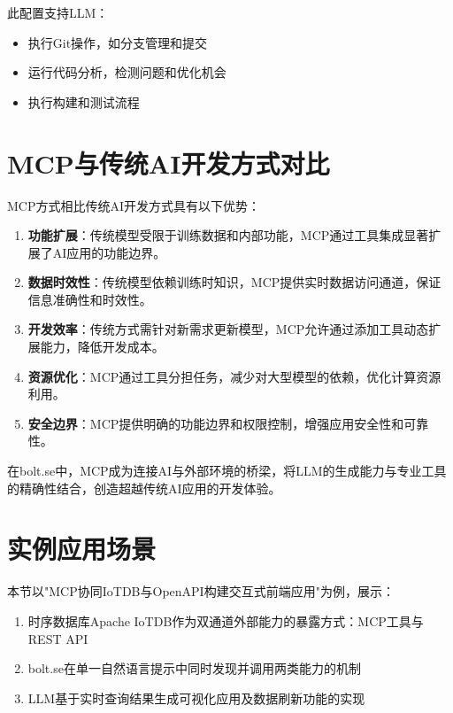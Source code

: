此配置支持LLM：
\begin{itemize}
  \item 执行Git操作，如分支管理和提交
  \item 运行代码分析，检测问题和优化机会
  \item 执行构建和测试流程
\end{itemize}

\section{MCP与传统AI开发方式对比}

MCP方式相比传统AI开发方式具有以下优势：

\begin{enumerate}
  \item \textbf{功能扩展}：传统模型受限于训练数据和内部功能，MCP通过工具集成显著扩展了AI应用的功能边界。

  \item \textbf{数据时效性}：传统模型依赖训练时知识，MCP提供实时数据访问通道，保证信息准确性和时效性。

  \item \textbf{开发效率}：传统方式需针对新需求更新模型，MCP允许通过添加工具动态扩展能力，降低开发成本。

  \item \textbf{资源优化}：MCP通过工具分担任务，减少对大型模型的依赖，优化计算资源利用。

  \item \textbf{安全边界}：MCP提供明确的功能边界和权限控制，增强应用安全性和可靠性。
\end{enumerate}

在bolt.se中，MCP成为连接AI与外部环境的桥梁，将LLM的生成能力与专业工具的精确性结合，创造超越传统AI应用的开发体验。

\section{实例应用场景}
\label{sec:mcp-iotdb-demo}

本节以"MCP协同IoTDB与OpenAPI构建交互式前端应用"为例，展示：
\begin{enumerate}
  \item 时序数据库Apache IoTDB作为双通道外部能力的暴露方式：MCP工具与REST API
  \item bolt.se在单一自然语言提示中同时发现并调用两类能力的机制
  \item LLM基于实时查询结果生成可视化应用及数据刷新功能的实现
\end{enumerate}

